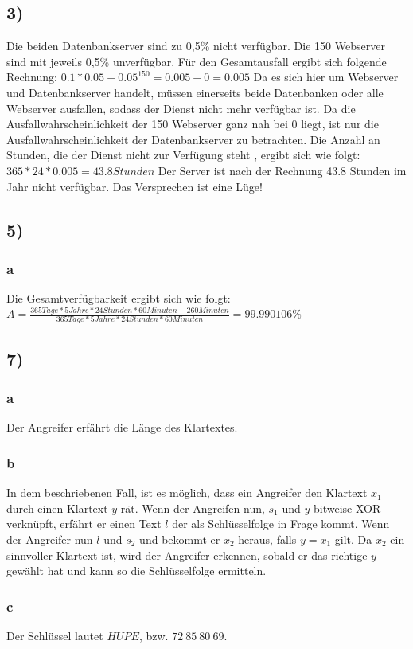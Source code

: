 \documentclass[ngerman]{fbi-aufgabenblatt}
\begin{document}
	\setcounter{section}{0}


	\subsection*{3)}
  Die beiden Datenbankserver sind zu 0,5\% nicht verfügbar. Die 150 Webserver
	sind mit jeweils 0,5\% unverfügbar.
	Für den Gesamtausfall ergibt sich folgende Rechnung: \newline
	$0.1* 0.05 + {0.05}^{150} = 0.005 + 0 = 0.005$ \newline
	Da es sich hier um Webserver und Datenbankserver handelt, müssen einerseits
	beide Datenbanken
	oder alle Webserver ausfallen, sodass der Dienst nicht mehr verfügbar ist.
	Da die Ausfallwahrscheinlichkeit der 150 Webserver ganz nah bei 0 liegt, ist
	nur die Ausfallwahrscheinlichkeit der Datenbankserver zu betrachten.
	\newline
	Die Anzahl an Stunden, die der Dienst nicht zur Verfügung steht , ergibt sich wie folgt: \newline
	$365 * 24 * 0.005 = 43.8 Stunden$ \newline
	Der Server ist nach der Rechnung 43.8 Stunden im Jahr nicht verfügbar.
	Das Versprechen ist eine Lüge!
	
	\subsection*{5)}

  \subsubsection*{a}
  Die Gesamtverfügbarkeit ergibt sich wie folgt: \newline
  \newline
  $A = \frac{365 Tage * 5 Jahre * 24 Stunden * 60 Minuten - 260 Minuten}{365 Tage * 5
  Jahre * 24 Stunden * 60 Minuten}= 99.990106 \%$
  

	
	\subsection*{7)}
  \subsubsection*{a}
  Der Angreifer erfährt die Länge des Klartextes.
    \subsubsection*{b}
In dem beschriebenen Fall, ist es möglich, dass ein Angreifer den Klartext $x_1$ durch einen Klartext $y$ rät. Wenn der Angreifen nun, $s_1$ und $y$ bitweise XOR-verknüpft, erfährt er einen Text $l$ der als Schlüsselfolge in Frage kommt. Wenn der Angreifer nun $l$ und $s_2$ und bekommt er $x_2$ heraus, falls $y=x_1$ gilt. Da $x_2$ ein sinnvoller Klartext ist, wird der Angreifer erkennen, sobald er das richtige $y$ gewählt hat und kann so die Schlüsselfolge ermitteln.
      \subsubsection*{c}
      Der Schlüssel lautet $HUPE$, bzw. $72\ 85\ 80\ 69$.
\end{document}

